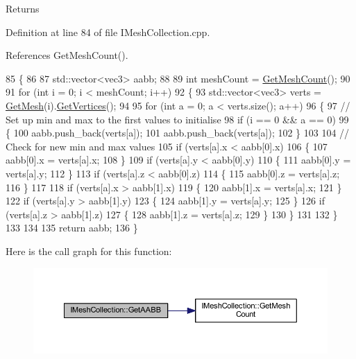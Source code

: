 \begin{DoxyReturn}{Returns}

\end{DoxyReturn}


Definition at line 84 of file I\+Mesh\+Collection.\+cpp.



References Get\+Mesh\+Count().


\begin{DoxyCode}
85 \{
86 
87     std::vector<vec3> aabb;
88 
89     \textcolor{keywordtype}{int} meshCount = \hyperlink{class_i_mesh_collection_adf67edfc7e63ed993082714cfc9de7e2}{GetMeshCount}();
90 
91     \textcolor{keywordflow}{for} (\textcolor{keywordtype}{int} i = 0; i < meshCount; i++)
92     \{
93         std::vector<vec3> verts = \hyperlink{class_i_mesh_collection_a69a697dbe55af35db69dc056aef900a5}{GetMesh}(i).\hyperlink{class_i_mesh_afb0bb17c66970b42cd883cf7ea2c6199}{GetVertices}();
94 
95         \textcolor{keywordflow}{for} (\textcolor{keywordtype}{int} a = 0; a < verts.size(); a++)
96         \{
97             \textcolor{comment}{// Set up min and max to the first values to initialise}
98             \textcolor{keywordflow}{if} (i == 0 && a == 0)
99             \{
100                 aabb.push\_back(verts[a]);
101                 aabb.push\_back(verts[a]);
102             \}
103 
104             \textcolor{comment}{// Check for new min and max values}
105             \textcolor{keywordflow}{if} (verts[a].x < aabb[0].x)
106             \{
107                 aabb[0].x = verts[a].x;
108             \}
109             \textcolor{keywordflow}{if} (verts[a].y < aabb[0].y)
110             \{
111                 aabb[0].y = verts[a].y;
112             \}
113             \textcolor{keywordflow}{if} (verts[a].z < aabb[0].z)
114             \{
115                 aabb[0].z = verts[a].z;
116             \}
117 
118             \textcolor{keywordflow}{if} (verts[a].x > aabb[1].x)
119             \{
120                 aabb[1].x = verts[a].x;
121             \}
122             \textcolor{keywordflow}{if} (verts[a].y > aabb[1].y)
123             \{
124                 aabb[1].y = verts[a].y;
125             \}
126             \textcolor{keywordflow}{if} (verts[a].z > aabb[1].z)
127             \{
128                 aabb[1].z = verts[a].z;
129             \}
130         \}
131         
132     \}
133 
134 
135     \textcolor{keywordflow}{return} aabb;
136 \}
\end{DoxyCode}


Here is the call graph for this function\+:\nopagebreak
\begin{figure}[H]
\begin{center}
\leavevmode
\includegraphics[width=350pt]{class_i_mesh_collection_a9220e6bdd01ac0b8026149918ea73c41_cgraph}
\end{center}
\end{figure}


